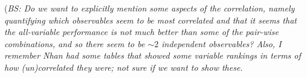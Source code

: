 (\emph{BS: Do we want to explicitly mention some aspects of the correlation, namely quantifying which observables seem to be most correlated and that it seems that the all-variable performance is not much better than some of the pair-wise combinations, and so there seem to be $\sim2$ independent observables? Also, I remember Nhan had some tables that showed some variable rankings in terms of how (un)correlated they were; not sure if we want to show these.}



